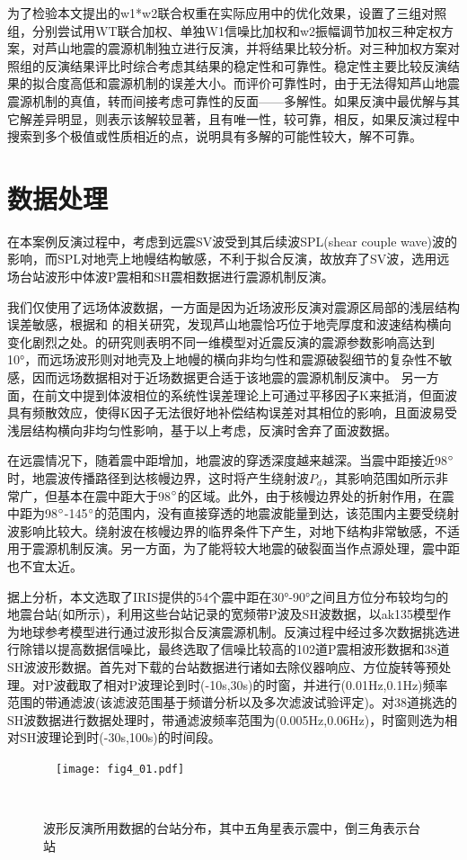 为了检验本文提出的w1*w2联合权重在实际应用中的优化效果，设置了三组对照组，分别尝试用WT联合加权、单独W1信噪比加权和w2振幅调节加权三种定权方案，对芦山地震的震源机制独立进行反演，并将结果比较分析。对三种加权方案对照组的反演结果评比时综合考虑其结果的稳定性和可靠性。稳定性主要比较反演结果的拟合度高低和震源机制的误差大小。而评价可靠性时，由于无法得知芦山地震震源机制的真值，转而间接考虑可靠性的反面——多解性。如果反演中最优解与其它解差异明显，则表示该解较显著，且有唯一性，较可靠，相反，如果反演过程中搜索到多个极值或性质相近的点，说明具有多解的可能性较大，解不可靠。

\section{数据处理}

在本案例反演过程中，考虑到远震SV波受到其后续波SPL(shear couple wave)波的影响，而SPL对地壳上地幔结构敏感，不利于拟合反演，故放弃了SV波，选用远场台站波形中体波P震相和SH震相数据进行震源机制反演。

我们仅使用了远场体波数据，一方面是因为近场波形反演对震源区局部的浅层结构误差敏感，根据和 的相关研究，发现芦山地震恰巧位于地壳厚度和波速结构横向变化剧烈之处。的研究则表明不同一维模型对近震反演的震源参数影响高达到10°，而远场波形则对地壳及上地幔的横向非均匀性和震源破裂细节的复杂性不敏感，因而远场数据相对于近场数据更合适于该地震的震源机制反演中。 
另一方面，在前文中提到体波相位的系统性误差理论上可通过平移因子K来抵消，但面波具有频散效应，使得K因子无法很好地补偿结构误差对其相位的影响，且面波易受浅层结构横向非均匀性影响，基于以上考虑，反演时舍弃了面波数据。

在远震情况下，随着震中距增加，地震波的穿透深度越来越深。当震中距接近98$^\circ$时，地震波传播路径到达核幔边界，这时将产生绕射波$P_d$，其影响范围如所示非常广\citep{Stein2003}，但基本在震中距大于98$^\circ$的区域。此外，由于核幔边界处的折射作用，在震中距为98$^\circ$-145$^\circ$的范围内，没有直接穿透的地震波能量到达，该范围内主要受绕射波影响比较大。绕射波在核幔边界的临界条件下产生，对地下结构非常敏感，不适用于震源机制反演。另一方面，为了能将较大地震的破裂面当作点源处理，震中距也不宜太近。

据上分析，本文选取了IRIS提供的54个震中距在30°-90°之间且方位分布较均匀的地震台站(如所示)，利用这些台站记录的宽频带P波及SH波数据，以ak135模型\citep{Kennett1995}作为地球参考模型进行通过波形拟合反演震源机制。反演过程中经过多次数据挑选进行除错以提高数据信噪比，最终选取了信噪比较高的102道P震相波形数据和38道SH波波形数据。首先对下载的台站数据进行诸如去除仪器响应、方位旋转等预处理。对P波截取了相对P波理论到时(-10s,30s)的时窗，并进行(0.01Hz,0.1Hz)频率范围的带通滤波(该滤波范围基于频谱分析以及多次滤波试验评定)。对38道挑选的SH波数据进行数据处理时，带通滤波频率范围为(0.005Hz,0.06Hz)，时窗则选为相对SH波理论到时(-30s,100s)的时间段。
\begin{figure}
\centering
  \texttt{[image: fig4\_01.pdf]}
  \caption{波形反演所用数据的台站分布，其中五角星表示震中，倒三角表示台站}
  \label{fig4_01}
\end{figure}


